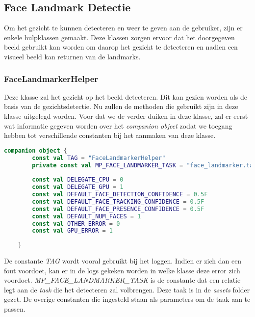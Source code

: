 \subsection{Face Landmark Detectie}
Om het gezicht te kunnen detecteren en weer te geven aan de gebruiker, zijn er enkele hulpklassen gemaakt. Deze klassen zorgen ervoor dat het doorgegeven beeld gebruikt kan worden om daarop het gezicht te detecteren en nadien een visueel beeld kan returnen van de landmarks.

\subsubsection{FaceLandmarkerHelper}
Deze klasse zal het gezicht op het beeld detecteren. Dit kan gezien worden als de basis van de gezichtsdetectie. Nu zullen de methoden die gebruikt zijn in deze klasse uitgelegd worden. Voor dat we de verder duiken in deze klasse, zal er eerst wat informatie gegeven worden over het \emph{companion object} zodat we toegang hebben tot verschillende constanten bij het aanmaken van deze klasse.

\begin{lstlisting}[language=Kotlin, caption=companion object van FaceLandmarkerHelper.kt]
    companion object {
        const val TAG = "FaceLandmarkerHelper"
        private const val MP_FACE_LANDMARKER_TASK = "face_landmarker.task"
        
        const val DELEGATE_CPU = 0
        const val DELEGATE_GPU = 1
        const val DEFAULT_FACE_DETECTION_CONFIDENCE = 0.5F
        const val DEFAULT_FACE_TRACKING_CONFIDENCE = 0.5F
        const val DEFAULT_FACE_PRESENCE_CONFIDENCE = 0.5F
        const val DEFAULT_NUM_FACES = 1
        const val OTHER_ERROR = 0
        const val GPU_ERROR = 1
        
    }
\end{lstlisting}
De constante \emph{TAG} wordt vooral gebruikt bij het loggen. Indien er zich dan een fout voordoet, kan er in de logs gekeken worden in welke klasse deze error zich voordoet. \emph{MP\_FACE\_LANDMARKER\_TASK} is de constante dat een relatie legt aan de \emph{task} die het detecteren zal volbrengen. Deze taak is in de \emph{assets} folder gezet. De overige constanten die ingesteld staan als parameters om de taak aan te passen.

